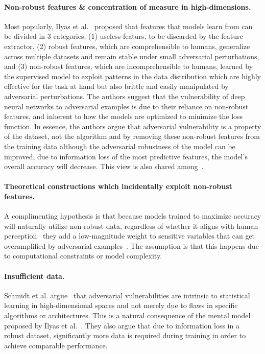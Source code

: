 \documentclass[a4paper, oneside]{discothesis}
\begin{document}
\paragraph{Non-robust features \& concentration of measure in high-dimensions.} Most popularly, Ilyas et al.\ \cite{ilyas2019adversarial} proposed that features that models learn from can be divided in 3 categories: (1) useless featurs, to be discarded by the feature extractor, (2) robust features, which are comprehensible to humans, generalize across multiple datasets and remain stable under small adversarial perturbations, and (3) non-robust features, which are incomprehensible to humans, learned by the supervised model to exploit patterns in the data distribution which are highly effective for the task at hand but also brittle and easily manipulated by adversarial perturbations. The authors suggest that the vulnerability of deep neural networks to adversarial examples is due to their reliance on non-robust features, and inherent to how the models are optimized to minimize the loss function. In essence, the authors argue that adversarial vulnerability is a property of the dataset, not the algorithm and by removing these non-robust features from the training data although the adversarial robustness of the model can be improved, due to information loss of the most predictive features, the model's overall accuracy will decrease. This view is also shared among~\cite{engstrom2019a, raghunathan2018certified, wong2018provable, xiao2018training, cohen2019certified, fawzi2018adversarial, mahloujifar2019curse, shafahi2018adversarial, gilmer2018adversarial, madry2017towards}.

\paragraph{Theoretical constructions which incidentally exploit non-robust features.} A complimenting hypothesis is that because models trained to maximize accuracy will naturally utilize non-robust data, regardless of whether it aligns with human perception~\cite{ilyas2019adversarial} they add a low-magnitude weight to sensitive variables that can get overamplified by adversarial examples~\cite{bubeck2019adversarial, nakkiran2019adversarial}. The assumption is that this happens due to computational constraints or model complexity.

\paragraph{Insufficient data.} Schmidt et al. argue~\cite{schmidt2018adversarially} that adversarial vulnerabilities are intrinsic to statistical learning in high-dimensional spaces and not merely due to flaws in specific algorithms or architectures. This is a natural consequence of the mental model proposed by Ilyas et al.\ \cite{ilyas2019adversarial}. They also argue that due to information loss in a robust dataset, significantly more data is required during training in order to achieve comparable performance.
\end{document}
